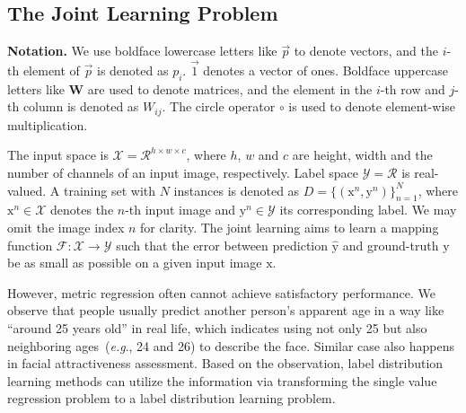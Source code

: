 \documentclass[5p,times,twocolumn]{elsarticle}
\makeatletter
\DeclareRobustCommand\onedot{\@onedot}
\def\@onedot{.}
\def\eg{\emph{e.g}\onedot}
\makeatother
\begin{document}
\subsection{The Joint Learning Problem}
\textbf{Notation.} We use boldface lowercase letters like $\vec p$ to denote vectors, and the $i$-th element of $\vec p$ is denoted as $p_i$. $\vec 1$ denotes a vector of ones. Boldface uppercase letters like $\mathbf{W}$ are used to denote matrices, and the element in the $i$-th row and $j$-th column is denoted as $W_{ij}$. The circle operator $\circ$ is used to denote element-wise multiplication.

The input space is $\mathcal{X}= \mathcal{R}^{h\times w \times c}$, where $h$, $w$ and $c$ are height, width and the number of channels of an input image, respectively. Label space $\mathcal{Y}= \mathcal{R}$ is real-valued. A training set with $N$ instances is denoted as $D=\{(\mathrm x^n, \mathrm y^n)\}_{n=1}^{N}$, where $\mathrm x^n\in \mathcal{X}$ denotes the $n$-th input image and $\mathrm y^n\in \mathcal{Y}$ its corresponding label. We may omit the image index $n$ for clarity. The joint learning aims to learn a mapping function $\mathcal F:\mathcal{X}\rightarrow\mathcal{Y}$ such that the error between prediction $\hat {\mathrm y}$ and ground-truth $\mathrm y$ be as small as possible on a given input image $\mathrm x$. 

However, metric regression often cannot achieve satisfactory performance. We observe that people usually predict another person's apparent age in a way like ``around 25 years old'' in real life, which indicates using not only 25 but also neighboring ages~(\eg, 24 and 26) to describe the face. Similar case also happens in facial attractiveness assessment. Based on the observation, label distribution learning methods can utilize the information via transforming the single value regression problem to a label distribution learning problem. 
\end{document}
